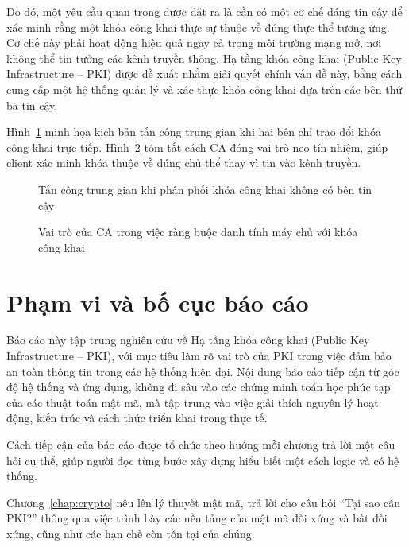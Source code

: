 Do đó, một yêu cầu quan trọng được đặt ra là cần có một cơ chế đáng tin cậy để xác minh rằng một khóa công khai thực sự thuộc về đúng thực thể tương ứng. Cơ chế này phải hoạt động hiệu quả ngay cả trong môi trường mạng mở, nơi không thể tin tưởng các kênh truyền thông. Hạ tầng khóa công khai (Public Key Infrastructure – PKI) được đề xuất nhằm giải quyết chính vấn đề này, bằng cách cung cấp một hệ thống quản lý và xác thực khóa công khai dựa trên các bên thứ ba tin cậy.

Hình~\ref{fig:mitm-attack} minh họa kịch bản tấn công trung gian khi hai bên chỉ trao đổi khóa công khai trực tiếp. Hình~\ref{fig:mitm-vs-pki} tóm tắt cách CA đóng vai trò neo tín nhiệm, giúp client xác minh khóa thuộc về đúng chủ thể thay vì tin vào kênh truyền.

\begin{figure}[htbp]
    \centering
    \caption{Tấn công trung gian khi phân phối khóa công khai không có bên tin cậy}
    \label{fig:mitm-attack}
\end{figure}

\begin{figure}[htbp]
    \centering
    \caption{Vai trò của CA trong việc ràng buộc danh tính máy chủ với khóa công khai}
    \label{fig:mitm-vs-pki}
\end{figure}

\section{Phạm vi và bố cục báo cáo}
\label{sec:1.2}

Báo cáo này tập trung nghiên cứu về Hạ tầng khóa công khai (Public Key Infrastructure – PKI), với mục tiêu làm rõ vai trò của PKI trong việc đảm bảo an toàn thông tin trong các hệ thống hiện đại. Nội dung báo cáo tiếp cận từ góc độ hệ thống và ứng dụng, không đi sâu vào các chứng minh toán học phức tạp của các thuật toán mật mã, mà tập trung vào việc giải thích nguyên lý hoạt động, kiến trúc và cách thức triển khai trong thực tế.

Cách tiếp cận của báo cáo được tổ chức theo hướng mỗi chương trả lời một câu hỏi cụ thể, giúp người đọc từng bước xây dựng hiểu biết một cách logic và có hệ thống.

Chương~\ref{chap:crypto} nêu lên lý thuyết mật mã, trả lời cho câu hỏi “Tại sao cần PKI?” thông qua việc trình bày các nền tảng của mật mã đối xứng và bất đối xứng, cũng như các hạn chế còn tồn tại của chúng.

